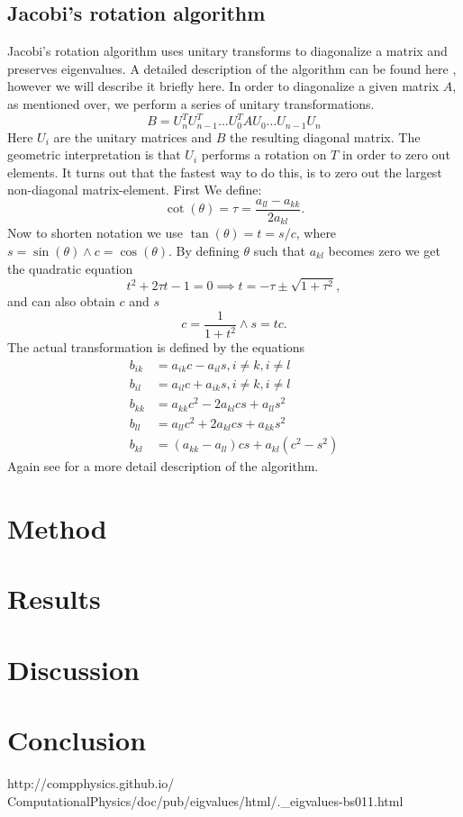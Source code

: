 \documentclass[reprint,english,notitlepage]{revtex4-1}  %
\begin{document}
\subsection{Jacobi's rotation algorithm}
Jacobi's rotation algorithm uses unitary transforms to diagonalize a matrix and preserves eigenvalues. A detailed description of the algorithm can be found here \citep{lecnotes}, however we will describe it briefly here. In order to diagonalize a given matrix $A$, as mentioned over, we perform a series of unitary transformations.
\begin{equation*}
	B = U_n^T U_{n-1}^T ... U_0^T A U_0 ... U_{n-1}U_n
\end{equation*}
Here $U_i$ are the unitary matrices and $B$ the resulting diagonal matrix. The geometric interpretation is that $U_i$ performs a rotation on $T$ in order to zero out elements. It turns out that the fastest way to do this, is to zero out the largest non-diagonal matrix-element. First We define:
\begin{equation*}
	\cot(\theta) = \tau = \frac{a_{ll} - a_{kk}}{2a_{kl}}.
\end{equation*}
Now to shorten notation we use $\tan(\theta) = t = s/c$, where $s = \sin(\theta) \wedge c = \cos(\theta)$. By defining $\theta$ such that $a_{kl}$ becomes zero we get the quadratic equation
\begin{equation*}
	t^2 + 2\tau t -1 = 0 \implies t = -\tau \pm \sqrt{1+\tau^2},
\end{equation*}
and can also obtain $c$ and $s$
\begin{equation*}
	c = \frac{1}{1+t^2} \wedge s = tc.
\end{equation*}
The actual transformation is defined by the equations
\begin{align*}
	b_{ik} &= a_{ik}c - a_{il}s, i \neq k, i \neq l \\
	b_{il} &= a_{il}c + a_{ik}s, i \neq k, i \neq l \\
	b_{kk} &= a_{kk}c^2 - 2a_{kl}cs + a_{ll}s^2 \\
	b_{ll} &= a_{ll}c^2 + 2a_{kl}cs + a_{kk}s^2 \\
	b_{kl} &= (a_{kk} - a_{ll} )cs + a_{kl}(c^2 - s^2)
\end{align*}
Again see \citep{lecnotes} for a more detail description of the algorithm.

\section{Method}

\section{Results}

\section{Discussion}

\section{Conclusion}

\onecolumngrid
\begin{thebibliography}{}
 http://compphysics.github.io/
ComputationalPhysics/doc/pub/eigvalues/html/.\_eigvalues-bs011.html
\end{thebibliography}
\end{document}
